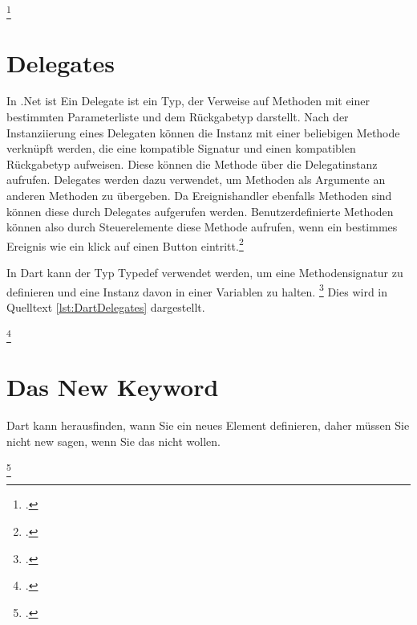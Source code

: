 \begin{minipage}{\linewidth}

\end{minipage}
\footcitetext[In Anlehnung an ][Abgerufen am \today]{Pedley2019}

\section{Delegates}

In .Net ist Ein Delegate ist ein Typ,  der Verweise auf Methoden mit einer bestimmten Parameterliste und dem Rückgabetyp darstellt.  Nach der Instanziierung eines Delegaten können die Instanz mit einer beliebigen Methode verknüpft werden,  die eine kompatible Signatur und einen kompatiblen Rückgabetyp aufweisen.  Diese können die Methode über die Delegatinstanz aufrufen.  Delegates werden dazu verwendet,  um Methoden als Argumente an anderen Methoden zu übergeben.  Da Ereignishandler ebenfalls Methoden sind können diese durch Delegates aufgerufen werden.  Benutzerdefinierte Methoden können also durch Steuerelemente diese Methode aufrufen, wenn ein bestimmes Ereignis wie ein klick auf einen Button eintritt.\footcite[Vgl.  ][Abgerufen am \today]{MicrosoftDelegates2015} 

In Dart kann der Typ Typedef verwendet werden, um eine Methodensignatur zu definieren und eine Instanz davon in einer Variablen zu halten. \footcite[Vgl. ][Abgerufen am \today]{Pedley2019}  Dies wird in Quelltext \ref{lst:DartDelegates} dargestellt. 


\begin{minipage}{\linewidth}

\end{minipage}
\footcitetext[In Anlehnung an ][Abgerufen am \today]{Pedley2019}

\section{Das New Keyword}


Dart kann herausfinden, wann Sie ein neues Element definieren, daher müssen Sie nicht new sagen, wenn Sie das nicht wollen.

\begin{minipage}{\linewidth}

\end{minipage}
\footcitetext[In Anlehnung an ][Abgerufen am \today]{Pedley2019}


